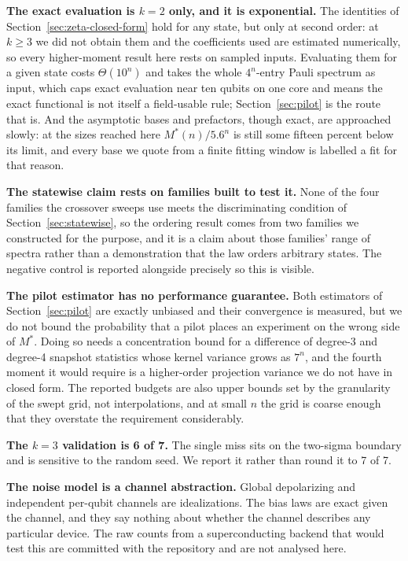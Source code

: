 \documentclass[a4paper,superscriptaddress,nofootinbib,onecolumn,nopdfoutputerror]{quantumarticle}
\begin{document}
\textbf{The exact evaluation is \(k = 2\) only, and it is exponential.}
The identities of Section~\ref{sec:zeta-closed-form} hold for any state,
but only at second order: at \(k \ge 3\) we did not obtain them and the
coefficients used are estimated numerically, so every higher-moment result
here rests on sampled inputs. Evaluating them for a given state costs
\(\Theta(10^n)\) and takes the whole \(4^n\)-entry Pauli spectrum as
input, which caps exact evaluation near ten qubits on one core and means
the exact functional is not itself a field-usable rule;
Section~\ref{sec:pilot} is the route that is. And the asymptotic bases and
prefactors, though exact, are approached slowly: at the sizes reached here
\(M^*(n)/5.6^n\) is still some fifteen percent below its limit, and every
base we quote from a finite fitting window is labelled a fit for that
reason.

\textbf{The statewise claim rests on families built to test it.} None of the four
families the crossover sweeps use meets the discriminating condition of Section~\ref{sec:statewise}, so the
ordering result comes from
two families we constructed for the purpose, and it is a claim about those
families' range of spectra rather than a demonstration that the law orders
arbitrary states. The negative control is reported alongside precisely so this is
visible.

\textbf{The pilot estimator has no performance guarantee.} Both estimators
of Section~\ref{sec:pilot} are exactly unbiased and their convergence is
measured, but we do not bound the probability that a pilot places an
experiment on the wrong side of \(M^*\). Doing so needs a concentration
bound for a difference of degree-3 and degree-4 snapshot statistics whose
kernel variance grows as \(7^n\), and the fourth moment it would require is
a higher-order projection variance we do not have in closed form. The
reported budgets are also upper bounds set by the granularity of the swept
grid, not interpolations, and at small \(n\) the grid is coarse enough that
they overstate the requirement considerably.

\textbf{The \(k=3\) validation is 6 of 7.} The single miss sits on the
two-sigma boundary and is sensitive to the random seed. We report it
rather than round it to 7 of 7.

\textbf{The noise model is a channel abstraction.} Global depolarizing
and independent per-qubit channels are idealizations. The bias laws are
exact given the channel, and they say nothing about whether the channel
describes any particular device. The raw counts from a superconducting
backend that would test this are committed with the repository and are not
analysed here.
\end{document}

